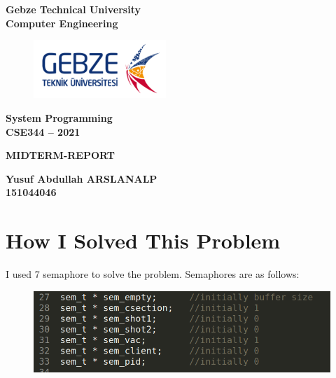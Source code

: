 \documentclass[10pt,english, openany]{book}
\begin{document}


\mainmatter


\begin{centering}

	{\LARGE \textbf{Gebze Technical University}} \\
	{\LARGE \textbf{Computer Engineering}} \\
	    \vspace{2.0cm}
	    
\begin{figure}[htp]
    \centering
    \includegraphics[width=5cm]{gtu_logo.png}
    
\end{figure}	    
	    
	    \vspace{2.0cm}
	    
	{\LARGE \textbf{System Programming}} \\
	{\LARGE \textbf{CSE344 – 2021}} \\
	    \vspace{3.0cm}
	
	{\LARGE \textbf{MIDTERM-REPORT}} \\
		\vspace{3.0cm}

	{\LARGE \textbf{Yusuf Abdullah ARSLANALP}} \\
	{\LARGE \textbf{151044046}} \\


\end{centering}



\newpage


\section{How I Solved This Problem}
I used 7 semaphore to solve the problem. Semaphores are as follows:

\vspace{0.5cm}

\begin{figure}[htp]
    \centering
    \includegraphics[width=15cm]{sems.png}
    
\end{figure}
\end{document}
